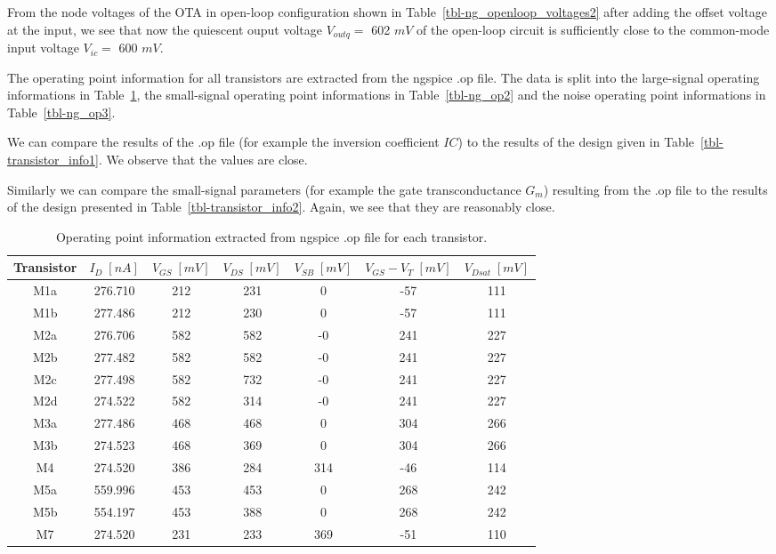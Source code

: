 \documentclass[
  a4paper,
  DIV=11,
  numbers=noendperiod]{scrreprt}
\begin{document}
From the node voltages of the OTA in open-loop configuration shown in
Table~\ref{tbl-ng_openloop_voltages2} after adding the offset voltage at
the input, we see that now the quiescent ouput voltage \(V_{outq} =\)
602 \(mV\) of the open-loop circuit is sufficiently close to the
common-mode input voltage \(V_{ic} =\) 600 \(mV\).

The operating point information for all transistors are extracted from
the ngspice .op file. The data is split into the large-signal operating
informations in Table~\ref{tbl-ng_op1}, the small-signal operating point
informations in Table~\ref{tbl-ng_op2} and the noise operating point
informations in Table~\ref{tbl-ng_op3}.

We can compare the results of the .op file (for example the inversion
coefficient \(IC\)) to the results of the design given in
Table~\ref{tbl-transistor_info1}. We observe that the values are close.

Similarly we can compare the small-signal parameters (for example the
gate transconductance \(G_m\)) resulting from the .op file to the
results of the design presented in Table~\ref{tbl-transistor_info2}.
Again, we see that they are reasonably close.

\begin{longtable}[]{@{}ccccccc@{}}

\caption{\label{tbl-ng_op1}Operating point information extracted from
ngspice .op file for each transistor.}

\tabularnewline

\toprule\noalign{}
Transistor & \(I_D\;[nA]\) & \(V_{GS}\;[mV]\) & \(V_{DS}\;[mV]\) &
\(V_{SB}\;[mV]\) & \(V_{GS}-V_T\;[mV]\) & \(V_{Dsat}\;[mV]\) \\
\midrule\noalign{}
\endhead
\bottomrule\noalign{}
\endlastfoot
M1a & 276.710 & 212 & 231 & 0 & -57 & 111 \\
M1b & 277.486 & 212 & 230 & 0 & -57 & 111 \\
M2a & 276.706 & 582 & 582 & -0 & 241 & 227 \\
M2b & 277.482 & 582 & 582 & -0 & 241 & 227 \\
M2c & 277.498 & 582 & 732 & -0 & 241 & 227 \\
M2d & 274.522 & 582 & 314 & -0 & 241 & 227 \\
M3a & 277.486 & 468 & 468 & 0 & 304 & 266 \\
M3b & 274.523 & 468 & 369 & 0 & 304 & 266 \\
M4 & 274.520 & 386 & 284 & 314 & -46 & 114 \\
M5a & 559.996 & 453 & 453 & 0 & 268 & 242 \\
M5b & 554.197 & 453 & 388 & 0 & 268 & 242 \\
M7 & 274.520 & 231 & 233 & 369 & -51 & 110 \\

\end{longtable}
\end{document}
